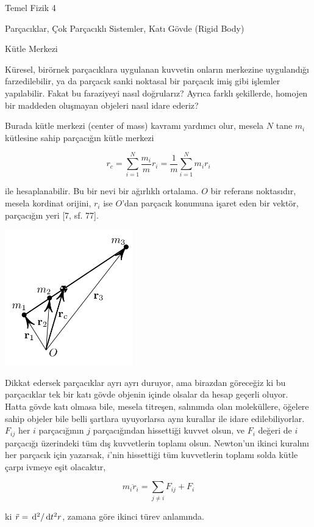 \documentclass[12pt,fleqn]{article}\usepackage{../../common}
\begin{document}
Temel Fizik 4 

Parçacıklar, Çok Parçacıklı Sistemler, Katı Gövde (Rigid Body)

Kütle Merkezi

Küresel, birörnek parçacıklara uygulanan kuvvetin onların merkezine uygulandığı
farzedilebilir, ya da parçacık sanki noktasal bir parçacık imiş gibi işlemler
yapılabilir. Fakat bu faraziyeyi nasıl doğrularız? Ayrıca farklı şekillerde,
homojen bir maddeden oluşmayan objeleri nasıl idare ederiz?

Burada kütle merkezi (center of mass) kavramı yardımcı olur, mesela $N$ tane
$m_i$ kütlesine sahip parçacığın kütle merkezi

$$
r_c =
\sum_{i=1}^{N} \frac{m_i}{m} r_i =
\frac{1}{m} \sum_{i=1}^{N} m_i r_i
$$

ile hesaplanabilir. Bu bir nevi bir ağırlıklı ortalama. $O$ bir referans
noktasıdır, mesela kordinat orijini, $r_i$ ise $O$'dan parçacık konumuna işaret
eden bir vektör, parçacığın yeri [7, sf. 77].

\includegraphics[width=15em]{phy_005_basics_08.png}

Dikkat edersek parçacıklar ayrı ayrı duruyor, ama birazdan göreceğiz ki bu
parçacıklar tek bir katı gövde objenin içinde olsalar da hesap geçerli
oluyor. Hatta gövde katı olmasa bile, mesela titreşen, salınımda olan
moleküllere, öğelere sahip objeler bile belli şartlara uyuyorlarsa aynı kurallar
ile idare edilebiliyorlar. $F_{ij}$ her $i$ parçacığının $j$ parçacığından
hissettiği kuvvet olsun, ve $F_i$ değeri de $i$ parçacığı üzerindeki tüm dış
kuvvetlerin toplamı olsun. Newton'un ikinci kuralını her parçacık için yazarsak,
$i$'nin hissettiği tüm kuvvetlerin toplamı solda kütle çarpı ivmeye eşit
olacaktır,

$$
m_i \ddot{r}_i = \sum_{j \ne i} F_{ij} + F_i
$$

ki $\ddot{r} = \,\mathrm{d}^2 / \,\mathrm{d} t^2 r$, zamana göre ikinci türev anlamında.
\end{document}
